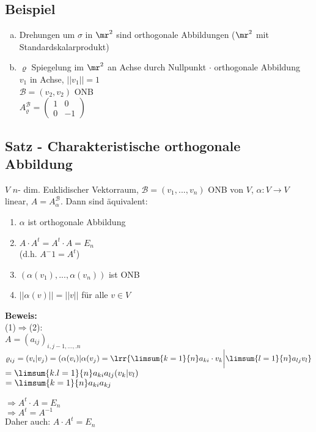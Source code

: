 \subsection{Beispiel}
	\begin{enumerate}[a)]
		\item  Drehungen um $ \sigma $ in $ \mr^2 $ sind orthogonale Abbildungen ($ \mr^2 $ mit Standardskalarprodukt)
		\item  $ \varrho $ Spiegelung im $ \mr^2 $ an Achse durch Nullpunkt $ \cdot $ orthogonale Abbildung\\
		$ v_1 $ in Achse, $||v_1||=1$\\
		$ \mathcal{B}=(v_2,v_2) $ ONB\\
		$ A_\varrho^{\mathcal{B}}=\begin{pmatrix}
		1&0\\
		0&-1
		\end{pmatrix}$
	\end{enumerate}
	
\subsection{Satz - Charakteristische orthogonale Abbildung}
	$ V $ $ n $- dim. Euklidischer Vektorraum, $ \mathcal{B}=(v_1,...,v_n) $ ONB von $ V $, $ \alpha: V\rightarrow V $ linear, $ A=A_\alpha^{\mathcal{B}} $. Dann sind äquivalent:
	\begin{enumerate}[(1)]
		\item $ \alpha $ ist orthogonale Abbildung
		\item  $ A\cdot A^t=A^t\cdot A=E_n $\\
		(d.h. $ A^-1=A^t $)
		\item  $ (\alpha(v_1),...,\alpha(v_n)) $ ist ONB
		\item $ ||\alpha(v)||=||v|| $ für alle $ v\in V $
	\end{enumerate}
	
	\textbf{Beweis:}\\
	(1)$ \Rightarrow $(2):\\
	$ A=(a_{ij})_{i,j-1,...,.n} $\\
	$ \varrho_{ij}=(v_i|v_j)=(\alpha(v_i)|\alpha(v_j)=\lrr{\limsum{k=1}{n}a_{ki}\cdot v_k\bigg|\limsum{l=1}{n}a_{lj}v_l} $\\
	$ =\limsum{k.l=1}{n}a_{ki}a_{lj}(v_k|v_l) $\\
	$ =\limsum{k=1}{n}a_{ki}a_{kj} $
	
	$ \Rightarrow A^t\cdot A=E_n $\\
	$ \Rightarrow A^t=A^{-1} $\\
	Daher auch: $ A\cdot A^t=E_n $
	
